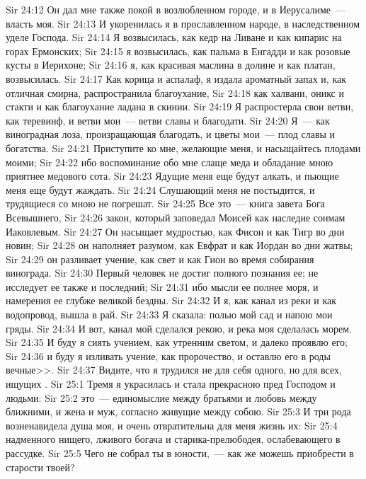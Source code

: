 \vs Sir 24:12 Он дал мне также покой в возлюбленном городе, и в Иерусалиме~--- власть моя.
\vs Sir 24:13 И укоренилась я в прославленном народе, в наследственном уделе Господа.
\vs Sir 24:14 Я возвысилась, как кедр на Ливане и как кипарис на горах Ермонских;
\vs Sir 24:15 я возвысилась, как пальма в Енгадди и как розовые кусты в Иерихоне;
\vs Sir 24:16 я, как красивая маслина в долине и как платан, возвысилась.
\vs Sir 24:17 Как корица и аспалаф, я издала ароматный запах и, как отличная смирна, распространила благоухание,
\vs Sir 24:18 как халвани, оникс и стакти и как благоухание ладана в скинии.
\vs Sir 24:19 Я распростерла свои ветви, как теревинф, и ветви мои~--- ветви славы и благодати.
\vs Sir 24:20 Я~--- как виноградная лоза, произращающая благодать, и цветы мои~--- плод славы и богатства.
\vs Sir 24:21 Приступите ко мне, желающие меня, и насыщайтесь плодами моими;
\vs Sir 24:22 ибо воспоминание обо мне слаще меда и обладание мною приятнее медового сота.
\vs Sir 24:23 Ядущие меня еще будут алкать, и пьющие меня еще будут жаждать.
\vs Sir 24:24 Слушающий меня не постыдится, и трудящиеся со мною не погрешат.
\vs Sir 24:25 Все это~--- книга завета Бога Всевышнего,
\vs Sir 24:26 закон, который заповедал Моисей как наследие сонмам Иаковлевым.
\vs Sir 24:27 Он насыщает мудростью, как Фисон и как Тигр во дни новин;
\vs Sir 24:28 он наполняет разумом, как Евфрат и как Иордан во дни жатвы;
\vs Sir 24:29 он разливает учение, как свет и как Гион во время собирания винограда.
\vs Sir 24:30 Первый человек не достиг полного познания ее; не исследует ее также и последний;
\vs Sir 24:31 ибо мысли ее полнее моря, и намерения ее глубже великой бездны.
\vs Sir 24:32 И я, как канал из реки и как водопровод, вышла в рай.
\vs Sir 24:33 Я сказала: полью мой сад и напою мои гряды.
\vs Sir 24:34 И вот, канал мой сделался рекою, и река моя сделалась морем.
\vs Sir 24:35 И буду я сиять учением, как утренним светом, и далеко проявлю его;
\vs Sir 24:36 и буду я изливать учение, как пророчество, и оставлю его в роды вечные>>.
\vs Sir 24:37 Видите, что я трудился не для себя одного, но для всех, ищущих .
\vs Sir 25:1 Тремя я украсилась и стала прекрасною пред Господом и людьми:
\vs Sir 25:2 это~--- единомыслие между братьями и любовь между ближними, и жена и муж, согласно живущие между собою.
\vs Sir 25:3 И три рода  возненавидела душа моя, и очень отвратительна для меня жизнь их:
\vs Sir 25:4 надменного нищего, лживого богача и старика-прелюбодея, ослабевающего в рассудке.
\vs Sir 25:5 Чего не собрал ты в юности,~--- как же можешь приобрести в старости твоей?
